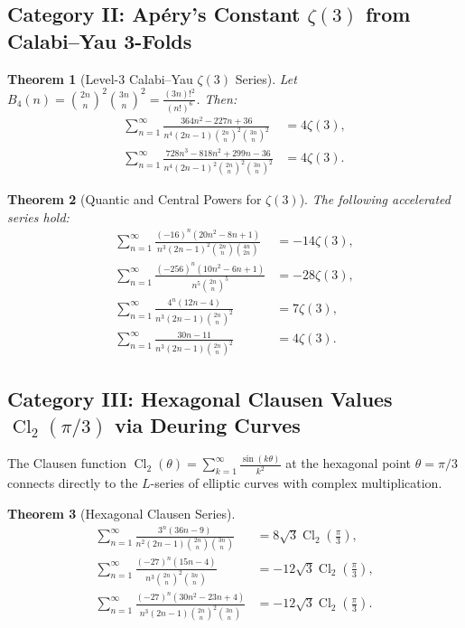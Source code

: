 \documentclass[11pt,a4paper]{article}
\newtheorem{theorem}{Theorem}[section]
\theoremstyle{definition}
\DeclareMathOperator{\Cl}{Cl}
\begin{document}
\subsection{Category II: Ap\'ery's Constant $\zeta(3)$ from Calabi--Yau 3-Folds}

\begin{theorem}[Level-3 Calabi--Yau $\zeta(3)$ Series]
Let $B_4(n) = \binom{2n}{n}^2 \binom{3n}{n}^2 = \frac{(3n)!^2}{(n!)^6}$. Then:
\begin{align}
\sum_{n=1}^\infty \frac{364 n^2 - 227 n + 36}{n^4 (2n-1) \binom{2n}{n}^2 \binom{3n}{n}^2} &= 4 \zeta(3), \label{eq:cy_zeta3_1} \\
\sum_{n=1}^\infty \frac{728 n^3 - 818 n^2 + 299 n - 36}{n^4 (2n-1)^2 \binom{2n}{n}^2 \binom{3n}{n}^2} &= 4 \zeta(3). \label{eq:cy_zeta3_2}
\end{align}
\end{theorem}

\begin{theorem}[Quantic and Central Powers for $\zeta(3)$]
The following accelerated series hold:
\begin{align}
\sum_{n=1}^\infty \frac{(-16)^n \left( 20 n^2 - 8 n + 1 \right)}{n^3 (2n-1)^2 \binom{2n}{n} \binom{4n}{2n}} &= -14 \zeta(3), \label{eq:quantic_zeta3} \\
\sum_{n=1}^\infty \frac{(-256)^n \left( 10 n^2 - 6 n + 1 \right)}{n^5 \binom{2n}{n}^5} &= -28 \zeta(3), \label{eq:b11_zeta3} \\
\sum_{n=1}^\infty \frac{4^n \left( 12 n - 4 \right)}{n^3 (2n-1) \binom{2n}{n}^2} &= 7 \zeta(3), \label{eq:b8_zeta3_1} \\
\sum_{n=1}^\infty \frac{30 n - 11}{n^3 (2n-1) \binom{2n}{n}^2} &= 4 \zeta(3). \label{eq:b8_zeta3_2}
\end{align}
\end{theorem}

\subsection{Category III: Hexagonal Clausen Values $\Cl_2(\pi/3)$ via Deuring Curves}

The Clausen function $\Cl_2(\theta) = \sum_{k=1}^\infty \frac{\sin(k\theta)}{k^2}$ at the hexagonal point $\theta = \pi/3$ connects directly to the $L$-series of elliptic curves with complex multiplication.

\begin{theorem}[Hexagonal Clausen Series]
\begin{align}
\sum_{n=1}^\infty \frac{3^n \left( 36n - 9 \right)}{n^2 (2n-1) \binom{2n}{n} \binom{3n}{n}} &= 8 \sqrt{3} \Cl_2\left(\frac{\pi}{3}\right), \label{eq:clausen_1} \\
\sum_{n=1}^\infty \frac{(-27)^n \left( 15n - 4 \right)}{n^3 \binom{2n}{n}^2 \binom{3n}{n}} &= -12 \sqrt{3} \Cl_2\left(\frac{\pi}{3}\right), \label{eq:clausen_2} \\
\sum_{n=1}^\infty \frac{(-27)^n \left( 30n^2 - 23n + 4 \right)}{n^3 (2n-1) \binom{2n}{n}^2 \binom{3n}{n}} &= -12 \sqrt{3} \Cl_2\left(\frac{\pi}{3}\right). \label{eq:clausen_3}
\end{align}
\end{theorem}
\end{document}
